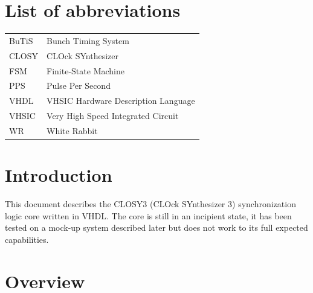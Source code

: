 \documentclass[a4paper,11pt]{article}
\begin{document}


\pagebreak
{}
\tableofcontents

\listoffigures
\listoftables

\pagebreak
\section*{List of abbreviations}
\begin{tabular}{l l}
BuTiS & Bunch Timing System \\
CLOSY & CLOck SYnthesizer \\
FSM   & Finite-State Machine \\
PPS   & Pulse Per Second \\
VHDL  & VHSIC Hardware Description Language \\
VHSIC & Very High Speed Integrated Circuit \\
WR    & White Rabbit \\
\end{tabular}

\pagebreak
\section{Introduction}
\label{sec:intro}

This document describes the CLOSY3 (CLOck SYnthesizer 3) synchronization logic
core written in VHDL. The core is still in an incipient state, it has been tested
on a mock-up system described later but does not work to its full expected
capabilities.

\section{Overview}
\end{document}
